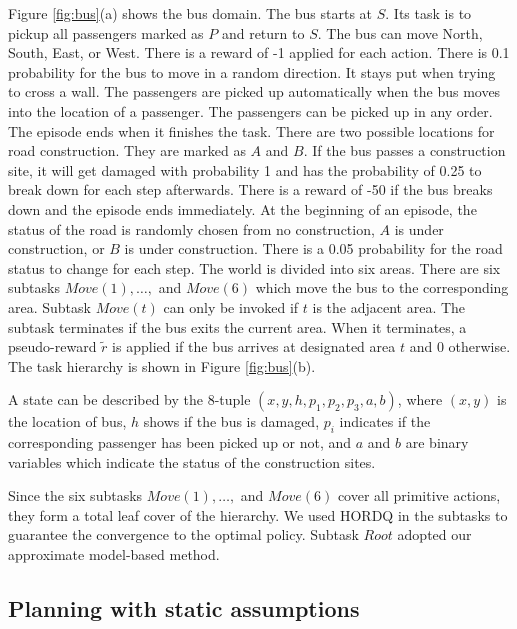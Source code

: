 Figure \ref{fig:bus}(a) shows the bus domain. The bus starts at $S$. Its task
is to pickup all passengers marked as $P$ and return to $S$.
The bus can move North, South, East, or West. There is a reward of -1 applied for each action.
There is 0.1 probability for the bus to move in a random direction. It stays put 
when trying to cross a wall. 
The passengers are picked up automatically when the bus moves into
the location of a passenger. The passengers can be picked up in any order.
The episode ends when it finishes the task.  
There are two possible locations for road construction. They are marked as 
$A$ and $B$. If the bus passes a construction site, it will get damaged with probability 1 and has the probability
of 0.25 to break down for each step afterwards. There is a reward of -50 if the bus breaks down and the episode ends immediately. 
At the beginning of an episode, the status of the road is randomly chosen from no construction, $A$ is under construction,
or $B$ is under construction. There is a 0.05 probability for the road status to change for each step.
The world is divided into six areas. There are six subtasks $Move(1), \dots,$ and $Move(6)$ which move the
bus to the corresponding area.
Subtask $Move(t)$ can only be invoked if $t$ is the adjacent area.
The subtask terminates if the bus exits the current area.
When it terminates, a pseudo-reward $\tilde{r}$ is applied if the bus arrives at designated area $t$ and 0 otherwise.
The task hierarchy is shown in Figure \ref{fig:bus}(b). 

A state can be described by the 8-tuple $(x, y, h, p_1, p_2, p_3, a, b)$, where $(x, y)$ is the location of 
bus, $h$ shows if the bus is damaged, $p_i$ indicates if the corresponding passenger has been picked up or not,
and $a$ and $b$ are binary variables which indicate the status of the construction sites.

Since the six subtasks $Move(1), \dots,$ and $Move(6)$ cover all primitive actions, they form a total leaf cover of the hierarchy.
We used HORDQ in the subtasks to guarantee the convergence to the optimal
policy. Subtask $Root$ adopted our approximate model-based method. 


\subsection{Planning with static assumptions}
\label{se:Model}

